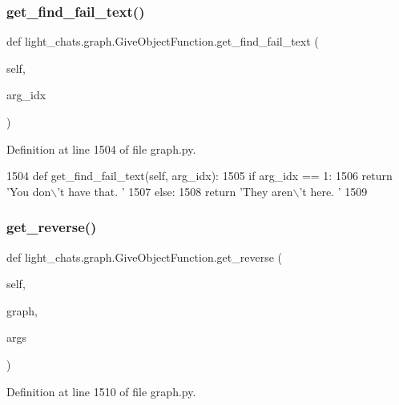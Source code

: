 \subsubsection{\texorpdfstring{get\+\_\+find\+\_\+fail\+\_\+text()}{get\_find\_fail\_text()}}
{\footnotesize\ttfamily def light\+\_\+chats.\+graph.\+Give\+Object\+Function.\+get\+\_\+find\+\_\+fail\+\_\+text (\begin{DoxyParamCaption}\item[{}]{self,  }\item[{}]{arg\+\_\+idx }\end{DoxyParamCaption})}



Definition at line 1504 of file graph.\+py.


\begin{DoxyCode}
1504     \textcolor{keyword}{def }get\_find\_fail\_text(self, arg\_idx):
1505         \textcolor{keywordflow}{if} arg\_idx == 1:
1506             \textcolor{keywordflow}{return} \textcolor{stringliteral}{'You don\(\backslash\)'t have that. '}
1507         \textcolor{keywordflow}{else}:
1508             \textcolor{keywordflow}{return} \textcolor{stringliteral}{'They aren\(\backslash\)'t here. '}
1509 
\end{DoxyCode}
\mbox{\label{classlight__chats_1_1graph_1_1GiveObjectFunction_a5339f851bf119b82f9f8d8abbbeeabb3}} 
\subsubsection{\texorpdfstring{get\+\_\+reverse()}{get\_reverse()}}
{\footnotesize\ttfamily def light\+\_\+chats.\+graph.\+Give\+Object\+Function.\+get\+\_\+reverse (\begin{DoxyParamCaption}\item[{}]{self,  }\item[{}]{graph,  }\item[{}]{args }\end{DoxyParamCaption})}



Definition at line 1510 of file graph.\+py.



